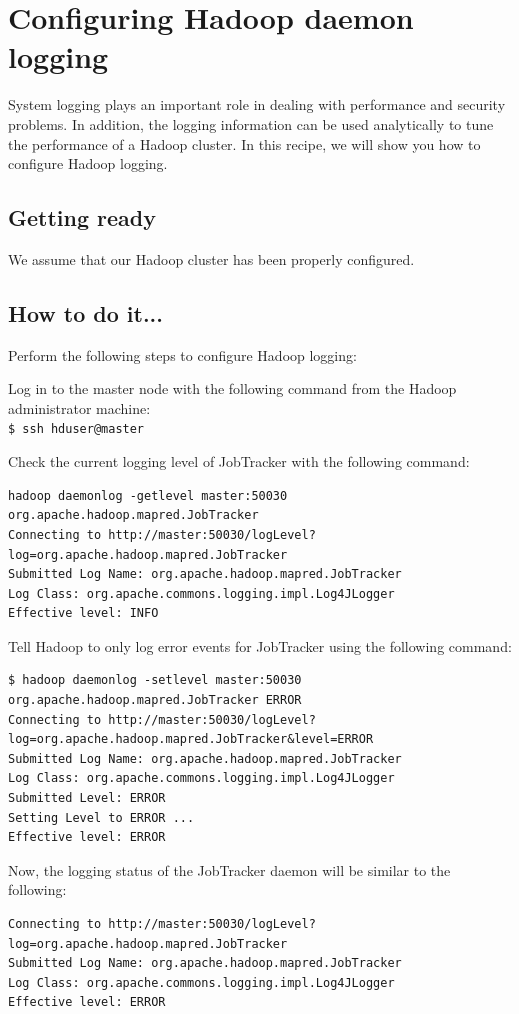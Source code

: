 \section{Configuring Hadoop daemon logging}
System logging plays an important role in dealing with performance and security problems. In addition, the logging information can be used analytically to tune the performance of a Hadoop cluster. In this recipe, we will show you how to configure Hadoop logging.

\subsection*{Getting ready}
We assume that our Hadoop cluster has been properly configured.

\subsection*{How to do it...}
Perform the following steps to configure Hadoop logging: 

Log in to the master node with the following command from the Hadoop administrator machine: \\ 
\verb|$ ssh hduser@master|

Check the current logging level of JobTracker with the following command:
\lstset{style=bashstyle}
\begin{lstlisting}
hadoop daemonlog -getlevel master:50030 org.apache.hadoop.mapred.JobTracker
Connecting to http://master:50030/logLevel?log=org.apache.hadoop.mapred.JobTracker
Submitted Log Name: org.apache.hadoop.mapred.JobTracker
Log Class: org.apache.commons.logging.impl.Log4JLogger
Effective level: INFO
\end{lstlisting}

Tell Hadoop to only log error events for JobTracker using the following command:
\lstset{style=bashstyle}
\begin{lstlisting}
$ hadoop daemonlog -setlevel master:50030 org.apache.hadoop.mapred.JobTracker ERROR
Connecting to http://master:50030/logLevel?log=org.apache.hadoop.mapred.JobTracker&level=ERROR
Submitted Log Name: org.apache.hadoop.mapred.JobTracker
Log Class: org.apache.commons.logging.impl.Log4JLogger
Submitted Level: ERROR
Setting Level to ERROR ...
Effective level: ERROR
\end{lstlisting}
Now, the logging status of the JobTracker daemon will be similar to the following:
\lstset{style=bashstyle}
\begin{lstlisting}
Connecting to http://master:50030/logLevel?log=org.apache.hadoop.mapred.JobTracker
Submitted Log Name: org.apache.hadoop.mapred.JobTracker
Log Class: org.apache.commons.logging.impl.Log4JLogger
Effective level: ERROR
\end{lstlisting}

